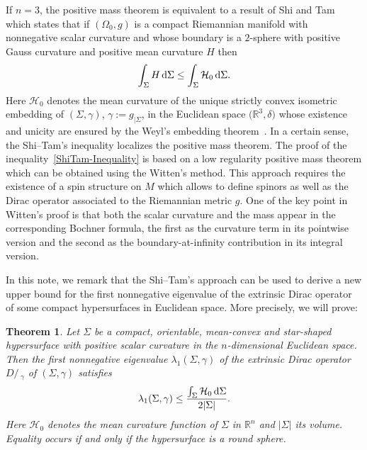 \documentclass[10pt,a4paper]{amsart}
\numberwithin{equation}{section}
\newtheorem{Theorem}{Theorem}[section]
\def\D{D\!\!\!\!/\,}
\begin{document}
If $n=3$, the positive mass theorem is equivalent to a result of Shi and Tam~\cite{ShiTam1} which states that if $(\Omega_0,g)$ is a compact Riemannian manifold with nonnegative scalar curvature and whose boundary is a $2$-sphere with positive Gauss curvature and positive mean curvature $H$ then
\begin{gather}\label{ShiTam-Inequality}
\int_\Sigma H\,{\rm d}\Sigma\leq \int_\Sigma \mathcal{H}_0\,{\rm d}\Sigma.
\end{gather}
Here $\mathcal{H}_0$ denotes the mean curvature of the unique strictly convex isometric embedding of $(\Sigma,\gamma)$, $\gamma:=g_{|\Sigma}$, in the Euclidean space $\big(\mathbb{R}^{3},\delta\big)$ whose existence and unicity are ensured by the Weyl's embedding theorem~\cite{Nirenberg,Pogorelov}. In a certain sense, the Shi--Tam's inequality localizes the positive mass theorem. The proof of the inequality~\eqref{ShiTam-Inequality} is based on a low regularity positive mass theorem which can be obtained using the Witten's method. This approach requires the existence of a spin structure on $M$ which allows to define spinors as well as the Dirac operator associated to the Riemannian metric $g$. One of the key point in Witten's proof is that both the scalar curvature and the mass appear in the corresponding Bochner formula, the first as the curvature term in its pointwise version and the second as the boundary-at-infinity contribution in its integral version.

In this note, we remark that the Shi--Tam's approach can be used to derive a new upper bound for the first nonnegative eigenvalue of the extrinsic Dirac operator of some compact hypersurfaces in Euclidean space. More precisely, we will prove:

\begin{Theorem}\label{NewUpperBound}
Let $\Sigma$ be a compact, orientable, mean-convex and star-shaped hypersurface with positive scalar curvature in the $n$-dimensional Euclidean space. Then the first nonnegative eigenvalue $\lambda_1(\Sigma,\gamma)$ of the extrinsic Dirac operator $\D_\gamma$ of $(\Sigma,\gamma)$ satisfies
\begin{gather}\label{NewUpperBound1}
\lambda_1(\Sigma,\gamma)\leq\frac{\int_\Sigma \mathcal{H}_0\,{\rm d}\Sigma}{2|\Sigma|}.
\end{gather}
Here $\mathcal{H}_0$ denotes the mean curvature function of $\Sigma$ in $\mathbb{R}^{n}$ and $|\Sigma|$ its volume. Equality occurs if and only if the hypersurface is a round sphere.
\end{Theorem}
\end{document}
